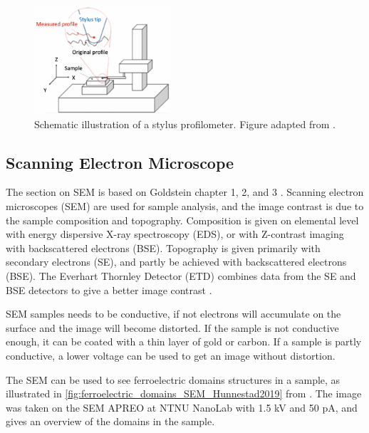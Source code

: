 \begin{figure}[ht]
    \centering
    \includegraphics[width=0.45\textwidth]{figures/profilometer.png}
    \caption{Schematic illustration of a stylus profilometer. Figure adapted from \cite{profilometer_manual}.}
    \label{fig:stylus_profilometer}
\end{figure}


\subsection{Scanning Electron Microscope}

\noindent The section on SEM is based on Goldstein chapter 1, 2, and 3 \cite{goldstein_scanning_2018}.
Scanning electron microscopes (SEM) are used for sample analysis, and the image contrast is due to the sample composition and topography.
Composition is given on elemental level with energy dispersive X-ray spectroscopy (EDS), or with Z-contrast imaging with backscattered electrons (BSE).
Topography is given primarily with secondary electrons (SE), and partly be achieved with backscattered electrons (BSE).
The Everhart Thornley Detector (ETD) combines data from the SE and BSE detectors to give a better image contrast \cite{T_Everhart_1960}.


SEM samples needs to be conductive, if not electrons will accumulate on the surface and the image will become distorted.
If the sample is not conductive enough, it can be coated with a thin layer of gold or carbon.
If a sample is partly conductive, a lower voltage can be used to get an image without distortion.

The SEM can be used to see ferroelectric domains structures in a sample, as illustrated in \autoref{fig:ferroelectric_domains_SEM_Hunnestad2019} from \cite{hunnestad_visualizing_2019}.
The image was taken on the SEM APREO at NTNU NanoLab with 1.5 kV and 50 pA, and gives an overview of the domains in the sample.


